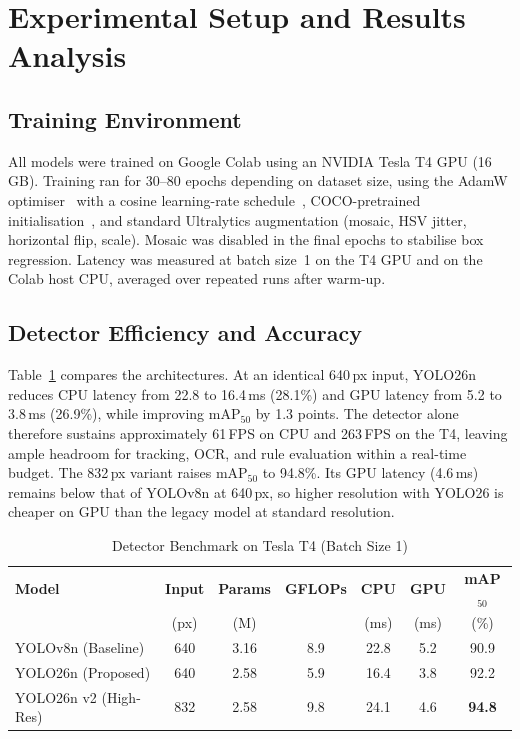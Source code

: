 \documentclass[conference]{IEEEtran}
\begin{document}
\section{Experimental Setup and Results Analysis}

\subsection{Training Environment}
All models were trained on Google Colab using an NVIDIA Tesla T4 GPU (16\,GB). Training ran for 30--80 epochs depending on dataset size, using the AdamW optimiser~\cite{loshchilov2019adamw} with a cosine learning-rate schedule~\cite{loshchilov2017sgdr}, COCO-pretrained initialisation~\cite{lin2014coco}, and standard Ultralytics augmentation (mosaic, HSV jitter, horizontal flip, scale). Mosaic was disabled in the final epochs to stabilise box regression. Latency was measured at batch size~1 on the T4 GPU and on the Colab host CPU, averaged over repeated runs after warm-up.

\subsection{Detector Efficiency and Accuracy}
Table~\ref{tab:bench} compares the architectures. At an identical 640\,px input, YOLO26n reduces CPU latency from 22.8 to 16.4\,ms (28.1\%) and GPU latency from 5.2 to 3.8\,ms (26.9\%), while improving mAP$_{50}$ by 1.3 points. The detector alone therefore sustains approximately 61\,FPS on CPU and 263\,FPS on the T4, leaving ample headroom for tracking, OCR, and rule evaluation within a real-time budget. The 832\,px variant raises mAP$_{50}$ to 94.8\%. Its GPU latency (4.6\,ms) remains below that of YOLOv8n at 640\,px, so higher resolution with YOLO26 is cheaper on GPU than the legacy model at standard resolution.

\begin{table}[!t]
\centering
\caption{Detector Benchmark on Tesla T4 (Batch Size 1)}
\label{tab:bench}
\setlength{\tabcolsep}{3pt}
\begin{tabular}{@{}lcccccc@{}}
\toprule
\textbf{Model} & \textbf{Input} & \textbf{Params} & \textbf{GFLOPs} & \textbf{CPU} & \textbf{GPU} & \textbf{mAP$_{50}$} \\
 & (px) & (M) & & (ms) & (ms) & (\%) \\
\midrule
YOLOv8n (Baseline) & 640 & 3.16 & 8.9 & 22.8 & 5.2 & 90.9 \\
YOLO26n (Proposed) & 640 & 2.58 & 5.9 & 16.4 & 3.8 & 92.2 \\
YOLO26n v2 (High-Res) & 832 & 2.58 & 9.8 & 24.1 & 4.6 & \textbf{94.8} \\
\bottomrule
\end{tabular}
\end{table}
\end{document}
